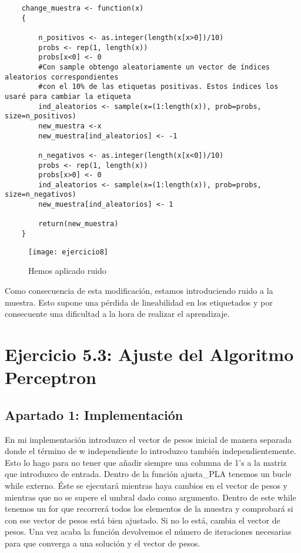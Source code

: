 	\newpage
	
	\begin{lstlisting}
	change_muestra <- function(x)
	{
	
		n_positivos <- as.integer(length(x[x>0])/10)
		probs <- rep(1, length(x))
		probs[x<0] <- 0
		#Con sample obtengo aleatoriamente un vector de índices aleatorios correspondientes
		#con el 10% de las etiquetas positivas. Estos índices los usaré para cambiar la etiqueta
		ind_aleatorios <- sample(x=(1:length(x)), prob=probs, size=n_positivos)
		new_muestra <-x
		new_muestra[ind_aleatorios] <- -1
		
		n_negativos <- as.integer(length(x[x<0])/10)
		probs <- rep(1, length(x))
		probs[x>0] <- 0
		ind_aleatorios <- sample(x=(1:length(x)), prob=probs, size=n_negativos)
		new_muestra[ind_aleatorios] <- 1
		
		return(new_muestra)
	}

	\end{lstlisting}
	
	\begin{figure} [H]
	\centering
	\texttt{[image: ejercicio8]}
	\caption{Hemos aplicado ruido}
	\label{fig:ejercicio8}
	\end{figure}

	\newpage
	
	Como consecuencia de esta modificación, estamos introduciendo ruido a la muestra. Esto supone una pérdida de lineabilidad en los etiquetados y por consecuente una dificultad a la hora de realizar el aprendizaje.
	
	\section{Ejercicio 5.3: Ajuste del Algoritmo Perceptron}
	\subsection{Apartado 1: Implementación}
	En mi implementación introduzco el vector de pesos inicial de manera separada donde el término de w independiente lo introduzco también independientemente. Esto lo hago para no tener que añadir siempre una columna de 1's a la matriz que introduzco de entrada. Dentro de la función ajusta\_PLA tenemos un bucle while externo. Éste se ejecutará mientras haya cambios en el vector de pesos y mientras que no se supere el umbral dado como argumento. Dentro de este while tenemos un for que recorrerá todos los elementos de la muestra y comprobará si con ese vector de pesos está bien ajustado. Si no lo está, cambia el vector de pesos. Una vez acaba la función devolvemos el número de iteraciones necesarias para que converga a una solución y el vector de pesos.
	
